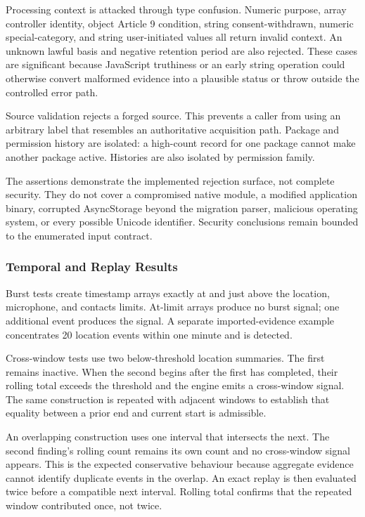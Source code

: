 Processing context is attacked through type confusion. Numeric purpose, array controller identity, object Article 9 condition, string consent-withdrawn, numeric special-category, and string user-initiated values all return invalid context. An unknown lawful basis and negative retention period are also rejected. These cases are significant because JavaScript truthiness or an early string operation could otherwise convert malformed evidence into a plausible status or throw outside the controlled error path.

Source validation rejects a forged source. This prevents a caller from using an arbitrary label that resembles an authoritative acquisition path. Package and permission history are isolated: a high-count record for one package cannot make another package active. Histories are also isolated by permission family.

The assertions demonstrate the implemented rejection surface, not complete security. They do not cover a compromised native module, a modified application binary, corrupted AsyncStorage beyond the migration parser, malicious operating system, or every possible Unicode identifier. Security conclusions remain bounded to the enumerated input contract.

\subsubsection{Temporal and Replay Results}

Burst tests create timestamp arrays exactly at and just above the location, microphone, and contacts limits. At-limit arrays produce no burst signal; one additional event produces the signal. A separate imported-evidence example concentrates 20 location events within one minute and is detected.

Cross-window tests use two below-threshold location summaries. The first remains inactive. When the second begins after the first has completed, their rolling total exceeds the threshold and the engine emits a cross-window signal. The same construction is repeated with adjacent windows to establish that equality between a prior end and current start is admissible.

An overlapping construction uses one interval that intersects the next. The second finding's rolling count remains its own count and no cross-window signal appears. This is the expected conservative behaviour because aggregate evidence cannot identify duplicate events in the overlap. An exact replay is then evaluated twice before a compatible next interval. Rolling total confirms that the repeated window contributed once, not twice.


